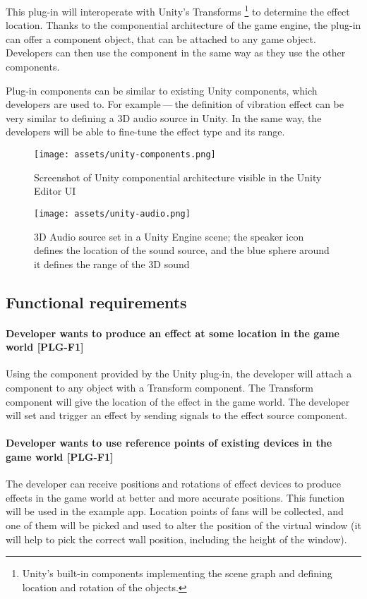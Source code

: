 This plug-in will interoperate with Unity’s Transforms
\footnote{Unity’s built-in components implementing the scene graph and defining location and rotation of the objects.}
to determine the effect location. Thanks to the
componential architecture of the game engine, the plug-in can offer
a component object, that can be attached to any game object.
Developers can then use the component in the same way as they use the other
components.

Plug-in components can be similar to existing Unity components, which
developers are used to. For example — the definition of vibration effect can be
very similar to defining a 3D audio source in Unity. In the same way, 
the developers will be able to fine-tune the effect type and its range.

\begin{figure}[H]{}
  \centering\texttt{[image: assets/unity-components.png]}
  \caption{Screenshot of Unity componential architecture visible in the Unity Editor UI}
\end{figure}

\begin{figure}[H]{}
  \centering\texttt{[image: assets/unity-audio.png]}
  \caption{3D Audio source set in a Unity Engine scene; the speaker icon defines 
  the location of the sound source, and the blue sphere around it defines the 
  range of the 3D sound}
  \end{figure}

\pagebreak

\subsection{Functional requirements}
\hypertarget{x-\textbf{developer-wants-to-produce-an-effect-at-some-location-in-the-game-world}-[plg-f1]}{\paragraph*{\textbf{Developer wants to produce an effect at some location in the game world} [PLG-F1]}}
Using the component provided by the Unity plug-in, the developer will attach
a component to any object with a Transform component. The Transform component
will give the location of the effect in the game world. The developer will
set and trigger an effect by sending signals to the effect source component.


\hypertarget{x-\textbf{developer-wants-to-use-reference-points-of-existing-devices-in-the-game-world}-[plg-f1]}{\paragraph*{\textbf{Developer wants to use reference points of existing devices in the game world} [PLG-F1]}}
The developer can receive
positions and rotations of effect devices to produce effects in the
game world at better and more accurate positions.
This function will be used in the example app. Location points of
fans will be collected, and one of them will be picked and used to alter
the position of the virtual window (it will help to pick the correct wall position,
including the height of the window).

